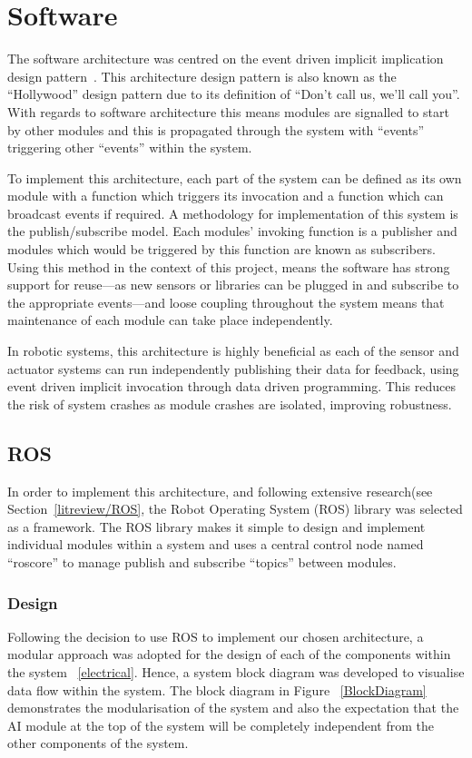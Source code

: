 
\chapter{Software}\label{software}
The software architecture was centred on the event driven implicit implication
design pattern~\cite{garlan1993introduction}. This architecture design pattern is
also known as the ``Hollywood'' design pattern due to its definition of ``Don't
call us, we'll call you''. With regards to software architecture this means
modules are signalled to start by other modules and this is propagated through
the system with ``events'' triggering other ``events'' within the system.

To implement this architecture, each part of the system can be defined as its own
module with a function which triggers its invocation and a function which can
broadcast events if required. A methodology for implementation of this system is
the publish/subscribe model. Each modules' invoking function is a publisher and
modules which would be triggered by this function are known as subscribers. Using
this method in the context of this project, means the software has strong support
for reuse---as new sensors or libraries can be plugged in and subscribe to the
appropriate events---and loose coupling throughout the system means that
maintenance of each module can take place independently.

In robotic systems, this architecture is highly beneficial as each of the sensor
and actuator systems can run independently publishing their data for feedback,
using event driven implicit invocation through data driven programming. This
reduces the risk of system crashes as module crashes are isolated, improving
robustness.

\section{ROS}\label{soft/ROS}
In order to implement this architecture, and following extensive research(see
Section~\ref{litreview/ROS}, the Robot Operating System (ROS) library was
selected as a framework. The ROS library makes it simple to design and implement
individual modules within a system and uses a central control node named
``roscore'' to manage publish and subscribe ``topics'' between modules.

\subsection{Design}\label{soft/ROS/design}
Following the decision to use ROS to implement our chosen architecture, a modular
approach was adopted for the design of each of the components within the system~
\ref{electrical}. Hence, a system block diagram was developed to visualise data flow
within the system. The block diagram in Figure~
\ref{BlockDiagram} demonstrates the modularisation of the system and also the
expectation that the AI module at the top of the system will be completely
independent from the other components of the system. 

